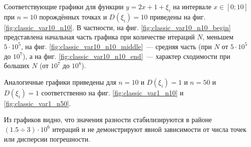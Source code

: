 \documentclass[11pt,a4paper]{article}
\theoremstyle{definition}
\begin{document}
Соответствующие графики для функции $y = 2x + 1 + \xi_i$ на интервале $x \in [0; 10]$ при
$n = 10$ порождённых точках и $D(\xi_i) = 10$ приведены на фиг. \ref{fig:classic_var10_n10}.
В частности, на фиг. \ref{fig:classic_var10_n10_begin}
представлена начальная часть графика при количестве итераций $N$, меньшем $5 \cdot 10^5$, 
на фиг. \ref{fig:classic_var10_n10_middle}~--- средняя часть (при $N$ от $5 \cdot 10^5$
до $10^7$), а на фиг. \ref{fig:classic_var10_n10_end}~--- характер сходимости при больших $N$
(от $10^7$ до $10^8$).

Аналогичные графики приведены для $n = 10$ и $D(\xi_i) = 1$ и $n = 50$ и $D(\xi_i) = 1$
соответственно на фиг. \ref{fig:classic_var1_n10} и \ref{fig:classic_var1_n50}.

Из графиков видно, что значения разности стабилизируются в районе $(1.5 \div 3) \cdot 10^6$
итераций и не демонстрируют явной зависимости от числа точек или дисперсии погрешности.
\end{document}
